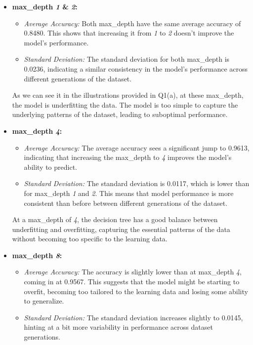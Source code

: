 \documentclass[acmconf,nonacm=true]{acmart}
\begin{document}
\begin{enumerate}
    \begin{itemize}
        \item \textbf{max\_depth \textit{1} \& \textit{2}:}
        \begin{itemize}
            \item \textit{Average Accuracy:} Both max\_depth have the same average accuracy of 0.8480. This shows that increasing it from \textit{1} to \textit{2} doesn't improve the model's performance.
            \item \textit{Standard Deviation:} The standard deviation for both max\_depth is 0.0236, indicating a similar consistency in the model's performance across different generations of the dataset.
        \end{itemize}

        As we can see it in the illustrations provided in Q1(a), at these max\_depth, the model is underfitting the data. The model is too simple to capture the underlying patterns of the dataset, leading to suboptimal performance.

        \item \textbf{max\_depth \textit{4}:}
        \begin{itemize}
            \item \textit{Average Accuracy:} The average accuracy sees a significant jump to 0.9613, indicating that increasing the max\_depth to \textit{4} improves the model's ability to predict.
            \item \textit{Standard Deviation:} The standard deviation is 0.0117, which is lower than for max\_depth \textit{1} and \textit{2}. This means that model performance is more consistent than before between different generations of the dataset.
        \end{itemize}

        At a max\_depth of \textit{4}, the decision tree has a good balance between underfitting and overfitting, capturing the essential patterns of the data without becoming too specific to the learning data.

        \item \textbf{max\_depth \textit{8}:}
        \begin{itemize}
            \item \textit{Average Accuracy:} The accuracy is slightly lower than at max\_depth \textit{4}, coming in at 0.9567. This suggests that the model might be starting to overfit, becoming too tailored to the learning data and losing some ability to generalize.
            \item \textit{Standard Deviation:} The standard deviation increases slightly to 0.0145, hinting at a bit more variability in performance across dataset generations.
        \end{itemize}


\end{itemize}
\end{enumerate}
\end{document}
